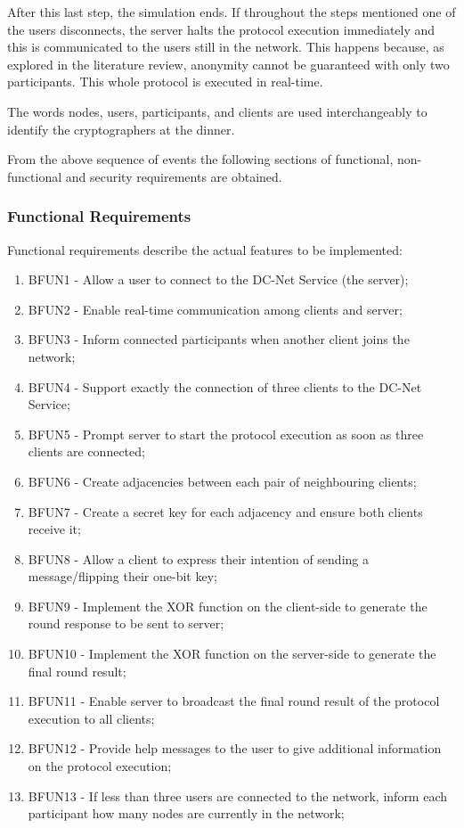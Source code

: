After this last step, the simulation ends. If throughout the steps mentioned one of the users disconnects, the server halts the protocol execution immediately and this is communicated to the users still in the network. This happens because, as explored in the literature review, anonymity cannot be guaranteed with only two participants. This whole protocol is executed in real-time.

The words nodes, users, participants, and clients are used interchangeably to identify the cryptographers at the dinner.

From the above sequence of events the following sections of functional, non-functional and security requirements are obtained.

\subsubsection{Functional Requirements}
Functional requirements describe the actual features to be implemented:
\begin{enumerate}
    \item BFUN1 - Allow a user to connect to the DC-Net Service (the server);
    \item BFUN2 - Enable real-time communication among clients and server;
    \item BFUN3 - Inform connected participants when another client joins the network;
    \item BFUN4 - Support exactly the connection of three clients to the DC-Net Service;
    \item BFUN5 - Prompt server to start the protocol execution as soon as three clients are connected;
    \item BFUN6 - Create adjacencies between each pair of neighbouring clients;
    \item BFUN7 - Create a secret key for each adjacency and ensure both clients receive it;
    \item BFUN8 - Allow a client to express their intention of sending a message/flipping their one-bit key;
    \item BFUN9 - Implement the XOR function on the client-side to generate the round response to be sent to server;
    \item BFUN10 - Implement the XOR function on the server-side to generate the final round result;
    \item BFUN11 - Enable server to broadcast the final round result of the protocol execution to all clients;
    \item BFUN12 - Provide help messages to the user to give additional information on the protocol execution;
    \item BFUN13 - If less than three users are connected to the network, inform each participant how many nodes are currently in the network;
\end{enumerate}

